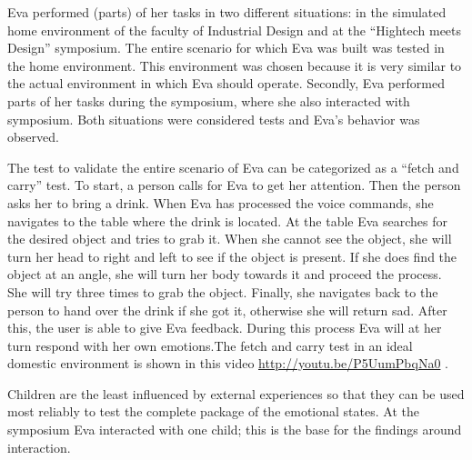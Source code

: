 \documentclass[project_eva.tex]{subfiles}
\begin{document}
Eva performed  (parts) of her tasks in two different situations: in the simulated home environment of the faculty of Industrial Design and at the ``Hightech meets Design''  symposium. The entire scenario for which Eva was built was tested in the home environment. This environment was chosen because it is very similar to the actual environment in which Eva should operate. Secondly, Eva performed parts of her tasks during the symposium, where she also interacted with symposium. Both situations were considered tests and Eva's behavior was observed.

The test to validate the entire scenario of Eva can be categorized as a ``fetch and carry'' test. To start, a person calls for Eva to get her attention. Then the person asks her to bring a drink. When Eva has processed the voice commands, she navigates to the table where the drink is located. At the table Eva searches for the desired object and tries to grab it. When she cannot see the object, she will turn her head to right and left to see if the object is present. If she does find the object at an angle, she will turn her body towards it and proceed the process. She will try three times to grab the object. Finally, she navigates back to the person to hand over the drink if she got it, otherwise she will return sad. After this, the user is able to give Eva feedback. During this process Eva will at her turn respond with her own emotions.The fetch and carry test in an ideal domestic environment is shown in this video \url{http://youtu.be/P5UumPbqNa0} . 

Children are the least influenced by external experiences so that they can be used most reliably to test the complete package of the emotional states.  At the symposium Eva interacted with one child; this is the base for the findings around interaction.
 
\end{document}
